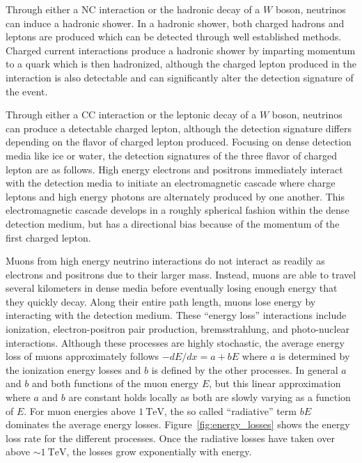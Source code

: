 Through either a NC interaction or the hadronic decay of a $W$ boson, neutrinos can induce a hadronic shower.
In a hadronic shower, both charged hadrons and leptons are produced which can be detected through well established methods.
Charged current interactions produce a hadronic shower by imparting momentum to a quark which is then hadronized, although the charged lepton produced in the interaction is also detectable and can significantly alter the detection signature of the event.

Through either a CC interaction or the leptonic decay of a $W$ boson, neutrinos can produce a detectable charged lepton, although the detection signature differs depending on the flavor of charged lepton produced.
Focusing on dense detection media like ice or water, the detection signatures of the three flavor of charged lepton are as follows.
High energy electrons and positrons immediately interact with the detection media to initiate an electromagnetic cascade where charge leptons and high energy photons are alternately produced by one another.
This electromagnetic cascade develops in a roughly spherical fashion within the dense detection medium, but has a directional bias because of the momentum of the first charged lepton.

Muons from high energy neutrino interactions do not interact as readily as electrons and positrons due to their larger mass.
Instead, muons are able to travel several kilometers in dense media before eventually losing enough energy that they quickly decay.
Along their entire path length, muons lose energy by interacting with the detection medium.
These ``energy loss'' interactions include ionization, electron-positron pair production, bremsstrahlung, and photo-nuclear interactions.
Although these processes are highly stochastic, the average energy loss of muons approximately follows $-dE/dx=a+bE$ where $a$ is determined by the ionization energy losses and $b$ is defined by the other processes.
In general $a$ and $b$ and both functions of the muon energy $E$, but this linear approximation where $a$ and $b$ are constant holds locally as both are slowly varying as a function of $E$.
For muon energies above $\SI{1}\TeV$, the so called ``radiative'' term $bE$ dominates the average energy losses.
Figure~\ref{fig:energy_losses} shows the energy loss rate for the different processes.
Once the radiative losses have taken over above $\sim\SI{1}\TeV$, the losses grow exponentially with energy.

